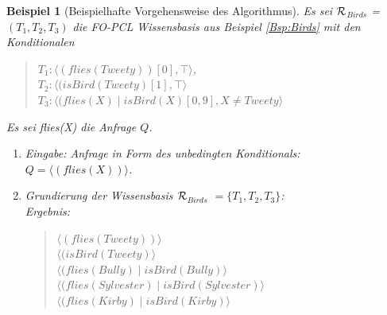 \documentclass[a4paper, 11pt]{book}
\newtheorem{Bsp}{Beispiel}[section]
\begin{document}
\begin{Bsp}[Beispielhafte Vorgehensweise des Algorithmus]
	
	Es sei  $ \cal{R} $$_{Birds}  $ = $ (T_1, T_2, T_3)  $ die FO-PCL Wissensbasis aus Beispiel \ref{Bsp:Birds} mit den Konditionalen 
	\begin{quote}
		$ T_{1}  :  \langle (flies(Tweety))[0], \top \rangle $,\\
		$ T_{2} : \langle (isBird(Tweety) [1], \top \rangle$\\
		$ T_{3} : \langle (flies(X) \mid isBird(X)[0,9], X \neq Tweety \rangle$\\
	\end{quote}
	Es sei flies(X) die Anfrage $ Q $.
	
	\begin{enumerate}
		\item Eingabe: Anfrage in Form des unbedingten Konditionals:\\
		$ Q = \langle (flies(X)) \rangle $.
		\item Grundierung der Wissensbasis $ \cal  R$$_{Birds}  $ $ = \{T_1, T_2, T_3\} $:\\
		Ergebnis:
		\begin{quote}
			$\langle (flies(Tweety))\rangle $\\
			$ \langle (isBird(Tweety) \rangle$ \\
			$  \langle (flies(Bully) \mid isBird(Bully) \rangle$ \\ 
			$\langle (flies(Sylvester) \mid isBird(Sylvester) \rangle$\\
			$ \langle (flies(Kirby) \mid isBird(Kirby) \rangle $\\
		\end{quote}
		

\end{enumerate}
\end{Bsp}
\end{document}
